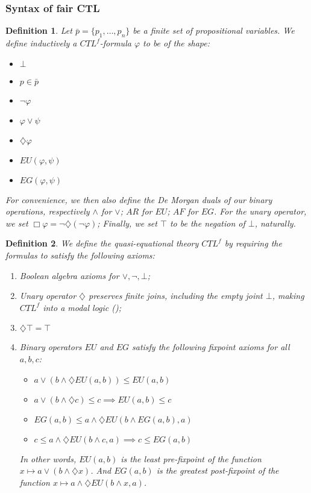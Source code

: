 \documentclass[11pt]{article}
\newcommand{\dia}{{\diamondsuit}}
\newtheorem*{definition}{Definition}
\begin{document}
\subsubsection*{Syntax of fair CTL}\label{subsec:syntax_CTLf}

\begin{definition}\label{CTLf_formulas}
    Let $\bar{p}= \{p_1,\ldots,p_n \}$ be a finite set of propositional variables. We define inductively 
    a \emph{$CTL^{f}$-formula} $\varphi$ to be of the shape:
    \begin{itemize}
        \setlength\itemsep{0em}
        \item[-] $\bot$
        \item[-] $p \in \bar{p}$
        \item[-] $\neg \varphi$
        \item[-] $\varphi \vee \psi$
        \item[-] $\dia \varphi$
        \item[-] $EU(\varphi,\psi)$
        \item[-] $EG(\varphi,\psi)$ 
    \end{itemize}
    For convenience, we then also define the De Morgan duals of our binary operations, respectively $\wedge$ for $\vee$; $AR$ for $EU$; $AF$ for $EG$. For the unary operator, we set $\Box \varphi = \neg \dia(\neg \varphi)$; Finally, we set $\top$ to be the negation of $\bot$, naturally.
\end{definition}


\begin{definition}\label{quasi_eq_CTLf}
    We define the \emph{quasi-equational theory $CTL^{f}$} by requiring the formulas to satisfy the following axioms:
    \begin{enumerate}
        \setlength\itemsep{0em}
        \item Boolean algebra axioms for $\vee,\neg,\bot$;
        \item Unary operator $\dia$ preserves finite joins, including the empty joint $\bot$, making $CTL^f$ into a modal logic (\cite{GehvG22});
        \item $\dia \top = \top$
        \item Binary operators $EU$ and $EG$ satisfy the following \emph{fixpoint axioms} for all $a,b,c$:
        \begin{itemize}
            \item[-] $a \vee (b \wedge \dia EU(a,b)) \leq EU(a,b)$
            \item[-] $a \vee (b \wedge \dia c) \leq c \implies EU(a,b) \leq c$ 
            \item[-] $EG(a,b)\leq a\wedge \dia EU(b\wedge EG(a,b),a)$
            \item[-] $c\leq a\wedge \dia EU(b\wedge c,a) \implies c \leq EG(a,b)$
        \end{itemize}
        In other words, $EU(a,b)$ is the \emph{least pre-fixpoint} of the function $x \mapsto a \vee (b \wedge \dia x)$.
        And $EG(a,b)$ is the \emph{greatest post-fixpoint} of the function $x \mapsto a\wedge \dia EU(b\wedge x,a)$.
    \end{enumerate}
\end{definition}
\end{document}
